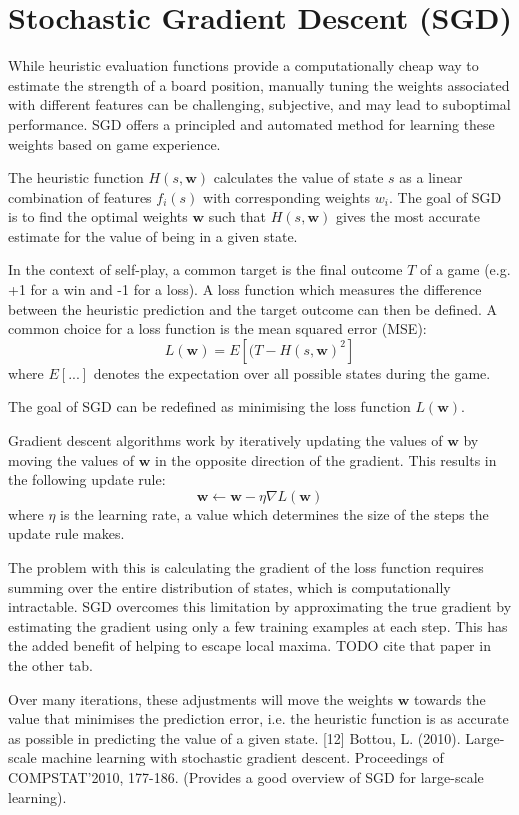 \section{Stochastic Gradient Descent (SGD)}
While heuristic evaluation functions provide a computationally cheap way to estimate the strength of a board position, manually tuning the weights associated with different features can be challenging, subjective, and may lead to suboptimal performance. SGD offers a principled and automated method for learning these weights based on game experience.

The heuristic function $H(s, \boldsymbol{w})$ calculates the value of state $s$ as a linear combination of features $f_i(s)$ with corresponding weights $w_i$. The goal of SGD is to find the optimal weights $\boldsymbol{w}$ such that $H(s, \boldsymbol{w})$ gives the most accurate estimate for the value of being in a given state.

In the context of self-play, a common target is the final outcome $T$ of a game (e.g. +1 for a win and -1 for a loss). A loss function which measures the difference between the heuristic prediction and the target outcome can then be defined. A common choice for a loss function is the mean squared error (MSE):
$$
L(\boldsymbol{w}) = E[(T - H(s, \boldsymbol{w})^2]
$$
where $E[...]$ denotes the expectation over all possible states during the game.

The goal of SGD can be redefined as minimising the loss function $L(\boldsymbol{w})$.

Gradient descent algorithms work by iteratively updating the values of $\boldsymbol{w}$ by moving the values of $\boldsymbol{w}$ in the opposite direction of the gradient. This results in the following update rule:
$$
\boldsymbol{w} \leftarrow \boldsymbol{w} - \eta \nabla L(\boldsymbol{w})
$$
where $\eta$ is the learning rate, a value which determines the size of the steps the update rule makes.

The problem with this is calculating the gradient of the loss function requires summing over the entire distribution of states, which is computationally intractable. SGD overcomes this limitation by approximating the true gradient by estimating the gradient using only a few training examples at each step. This has the added benefit of helping to escape local maxima. TODO cite that paper in the other tab.

Over many iterations, these adjustments will move the weights $\boldsymbol{w}$ towards the value that minimises the prediction error, i.e. the heuristic function is as accurate as possible in predicting the value of a given state. [12] Bottou, L. (2010). Large-scale machine learning with stochastic gradient descent. Proceedings of COMPSTAT'2010, 177-186. (Provides a good overview of SGD for large-scale learning).


